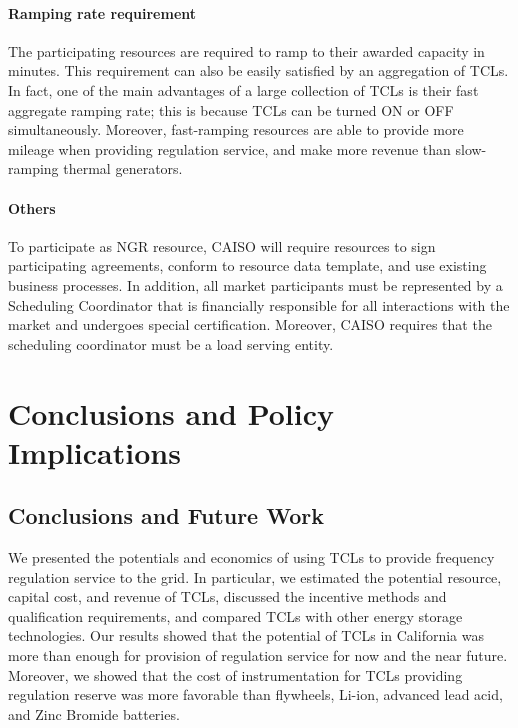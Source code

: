 \documentclass[onecolumn,journal]{IEEEtran}
\begin{document}
\begin{table}[tb]
\paragraph{Ramping rate requirement} The participating resources are required to ramp to their  awarded capacity in  minutes.  This requirement can also be easily satisfied by an aggregation of \acp{TCL}. In fact, one of the main advantages of a large collection of \acp{TCL} is their fast aggregate ramping rate; this is because \acp{TCL} can be turned ON or OFF simultaneously. Moreover, fast-ramping resources are able to provide more mileage when providing regulation service, and make more revenue than slow-ramping thermal generators. 

\paragraph{Others} To participate as NGR resource, \ac{CAISO} will require resources to sign participating agreements, conform to resource data template, and use existing business processes. In addition, all market participants must be represented by a Scheduling Coordinator that is financially responsible for all interactions with the market and undergoes special certification. Moreover, CAISO requires that the scheduling coordinator must be a load serving entity. 


\section{Conclusions and Policy Implications}
\label{sec:conclusion}


\subsection{Conclusions and Future Work}
We presented the potentials and economics of using \acp{TCL} to provide frequency regulation service to the grid. In particular, we estimated the potential resource, capital cost, and revenue of \acp{TCL}, discussed the incentive methods and qualification requirements, and compared \acp{TCL} with other energy storage technologies. Our results showed that the potential of \acp{TCL} in California was more than enough for provision of regulation service for now and the near future. Moreover, we showed  that the cost of instrumentation for \acp{TCL} providing regulation reserve was more favorable than flywheels, Li-ion, advanced lead acid, and Zinc Bromide batteries. 


\end{table}
\end{document}
